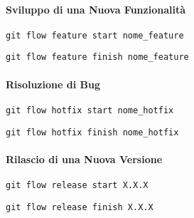     \paragraph*{Sviluppo di una Nuova Funzionalità}
    
    \begin{lstlisting}[style=code]
    git flow feature start nome_feature
    \end{lstlisting}
    
    
    \begin{lstlisting}[style=code]
    git flow feature finish nome_feature
    \end{lstlisting}
    
    \paragraph*{Risoluzione di Bug}
    
    \begin{lstlisting}[style=code]
    git flow hotfix start nome_hotfix
    \end{lstlisting}
    
    
    \begin{lstlisting}[style=code]
    git flow hotfix finish nome_hotfix
    \end{lstlisting}
    
    \paragraph*{Rilascio di una Nuova Versione}
    
    \begin{lstlisting}[style=code]
    git flow release start X.X.X
    \end{lstlisting}
    
    
    \begin{lstlisting}[style=code]
    git flow release finish X.X.X
    \end{lstlisting}
    
